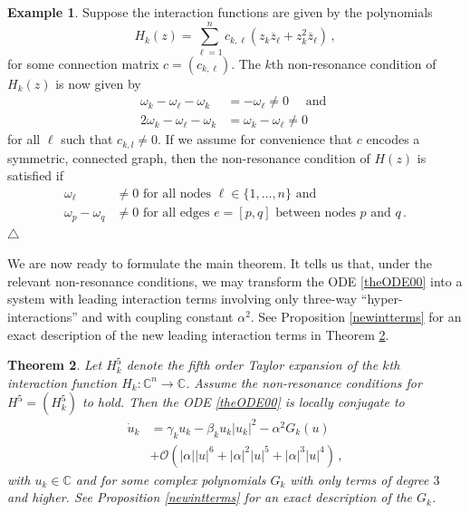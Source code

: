 \documentclass[12pt]{article}
\renewcommand{\mathcal}{\mathscr}
\theoremstyle{plain}
\newtheorem{thr}{Theorem}[section]
\theoremstyle{definition}
\newtheorem{ex}[thr]{Example}
\theoremstyle{remark}
\theoremstyle{remark}
\begin{document}
\begin{ex}\label{example0easyinters12}
Suppose the interaction functions are given by the polynomials
\begin{equation}
    H_k(z) = \sum_{\ell=1}^n c_{k, \ell}(z_k\overline{z}_\ell + z_k^2\overline{z}_{\ell})\, ,
\end{equation}
for some connection matrix $c = (c_{k, \ell})$. The $k$th non-resonance condition of $H_k(z)$ is now given by
\begin{align}
    \omega_k - \omega_{\ell} - \omega_k &= -\omega_{\ell} \not= 0 \quad \text { and } \\ \nonumber
   2\omega_k -\omega_{\ell} - \omega_k &= \omega_k - \omega_\ell \not= 0 
\end{align}
for all $\ell$ such that $c_{k,l} \not= 0$. If we assume for convenience that $c$ encodes a symmetric, connected graph, then the non-resonance condition of $H(z)$ is satisfied if
\begin{align}
    \omega_{\ell} &\not= 0 \text{ for all nodes } \ell \in \{1, \dots, n\} \text{ and } \\ \nonumber
    \omega_{p} - \omega_q &\not= 0  \text{ for all edges } e = [p,q] \text{ between nodes } p \text{ and } q\, .
\end{align} \hfill $\triangle$
\end{ex}

\noindent We are now ready to formulate the main theorem. It tells us that, under the  relevant non-resonance conditions, we may transform the ODE \eqref{theODE00} into a system with leading interaction terms involving only three-way ``hyper-interactions'' and with coupling constant $\alpha^2$.  See Proposition \ref{newintterms} for an exact description of the new leading interaction terms in Theorem \ref{main001}.


\begin{thr}\label{main001}
Let ${H}^5_k$ denote the fifth order Taylor expansion of the $k$th interaction function $H_k: \mathbb{C}^n \rightarrow \mathbb{C}$. Assume the non-resonance conditions for ${H}^5 = ({H}^5_k)$ to hold. Then the ODE \eqref{theODE00} is locally conjugate to 
\begin{align}\label{transformedODE001}
\dot{u}_k &= \gamma_ku_k - \beta_k u_k|u_k|^2 - \alpha^2G_k(u) \\ \nonumber
&+ \mathcal{O}(|\alpha||u|^6 +|\alpha|^2|u|^5 + |\alpha|^3|u|^4 )\, ,
\end{align}
with $u_k \in \mathbb{C}$ and for some complex polynomials $G_k$ with only terms of degree $3$ and higher. See Proposition \ref{newintterms} for an exact description of the $G_k$.
\end{thr}
\end{document}
